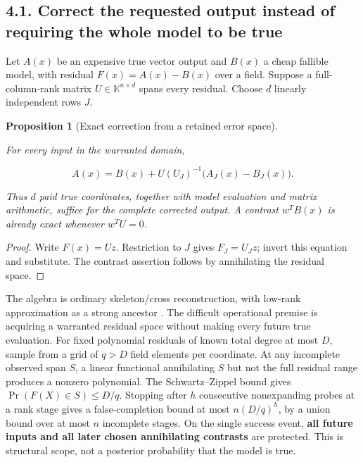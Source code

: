 \documentclass{article}
\newtheorem{proposition}[theorem]{Proposition}
\theoremstyle{definition}
\begin{document}
\subsection{4.1. Correct the requested output instead of requiring the
whole model to be true}\label{sec-correction}

Let \(A(x)\) be an expensive true vector output and \(B(x)\) a cheap
fallible model, with residual \(F(x)=A(x)-B(x)\) over a field. Suppose a
full-column-rank matrix \(U\in\mathbb K^{n\times d}\) spans every
residual. Choose \(d\) linearly independent rows \(J\).

\begin{proposition}[Exact correction from a retained error space]\label{prop-correction}

For every input in the warranted domain,

\begin{equation}
A(x)=B(x)+U(U_J)^{-1}\bigl(A_J(x)-B_J(x)\bigr).
 \label{eq-correction}
\end{equation}

Thus \(d\) paid true coordinates, together with model evaluation and
matrix arithmetic, suffice for the complete corrected output. A contrast
\(w^TB(x)\) is already exact whenever \(w^TU=0\).

\end{proposition}

\begin{proof}

Write \(F(x)=Uz\). Restriction to \(J\) gives \(F_J=U_Jz\); invert this
equation and substitute. The contrast assertion follows by annihilating
the residual space.
\end{proof}

The algebra is ordinary skeleton/cross reconstruction, with low-rank
approximation as a strong ancestor \citep{cross}. The difficult
operational premise is acquiring a warranted residual space without
making every future true evaluation. For fixed polynomial residuals of
known total degree at most \(D\), sample from a grid of \(q>D\) field
elements per coordinate. At any incomplete observed span \(S\), a linear
functional annihilating \(S\) but not the full residual range produces a
nonzero polynomial. The Schwartz--Zippel bound gives
\(\Pr(F(X)\in S)\leq D/q\). Stopping after \(h\) consecutive
nonexpanding probes at a rank stage gives a false-completion bound at
most \(n(D/q)^h\), by a union bound over at most \(n\) incomplete
stages. On the single success event, \textbf{all future inputs and all
later chosen annihilating contrasts} are protected. This is structural
scope, not a posterior probability that the model is true.
\end{document}
